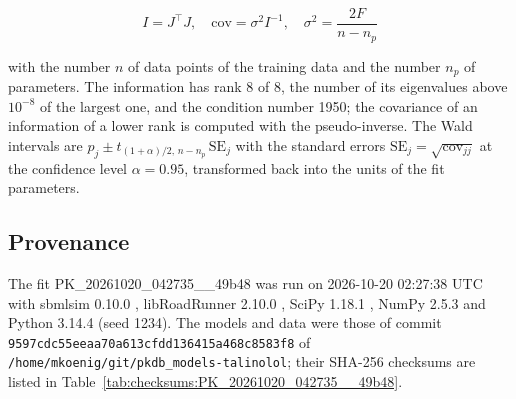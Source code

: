 \documentclass{article}
\begin{document}
\begin{equation}
I = J^\top J, \quad \mathrm{cov} = \sigma^2 I^{-1}, \quad \sigma^2 = \frac{2 F}{n - n_p}
\end{equation}

with the number $n$ of data points of the training data and the number $n_p$ of parameters. The information has rank 8 of 8, the number of its eigenvalues above $10^{-8}$ of the largest one, and the condition number 1950; the covariance of an information of a lower rank is computed with the pseudo-inverse. The Wald intervals are $\hat{p}_j \pm t_{(1+\alpha)/2,\, n-n_p}\, \mathrm{SE}_j$ with the standard errors $\mathrm{SE}_j = \sqrt{\mathrm{cov}_{jj}}$ at the confidence level $\alpha = 0.95$, transformed back into the units of the fit parameters.

\subsection{Provenance}

The fit PK\_20261020\_042735\_\_49b48 was run on 2026-10-20 02:27:38 UTC with sbmlsim 0.10.0 \cite{Koenig2026_sbmlsim}, libRoadRunner 2.10.0 \cite{Welsh2023}, SciPy 1.18.1 \cite{Virtanen2020}, NumPy 2.5.3 \cite{Harris2020} and Python 3.14.4 (seed 1234). The models and data were those of commit \texttt{9597cdc55eeaa70a613cfdd136415a468c8583f8} of \texttt{/home/mkoenig/git/pkdb\_models-talinolol}; their SHA-256 checksums are listed in Table~\ref{tab:checksums:PK_20261020_042735__49b48}.
\end{document}

